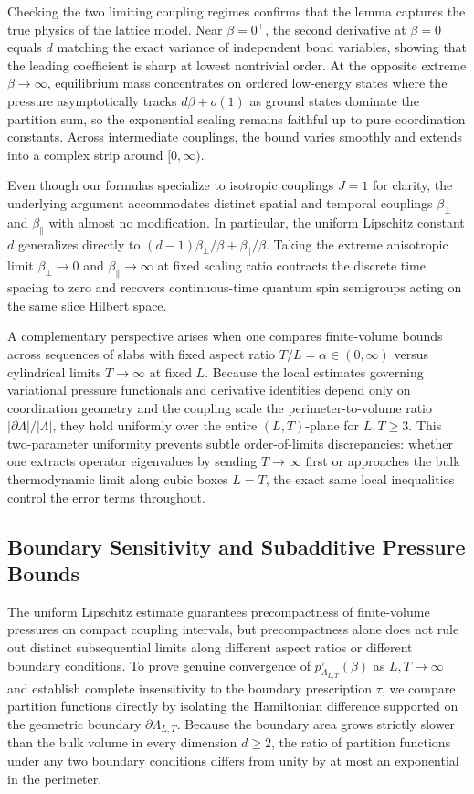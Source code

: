 \documentclass[11pt]{article}
\theoremstyle{definition}
\begin{document}
Checking the two limiting coupling regimes confirms that the lemma captures the true
physics of the lattice model. Near $\beta = 0^+$, the second derivative at $\beta =
0$ equals $d$ matching the exact variance of independent bond variables, showing
that the leading coefficient is sharp at lowest nontrivial order. At the opposite
extreme $\beta \to \infty$, equilibrium mass concentrates on ordered low-energy
states where the pressure asymptotically tracks $d\beta + o(1)$ as ground states
dominate the partition sum, so the exponential scaling remains faithful up to pure
coordination constants. Across intermediate couplings, the bound varies smoothly and
extends into a complex strip around $[0, \infty)$.

Even though our formulas specialize to isotropic couplings $J = 1$ for clarity, the
underlying argument accommodates distinct spatial and temporal couplings
$\beta_\perp$ and $\beta_\parallel$ with almost no modification. In particular, the
uniform Lipschitz constant $d$ generalizes directly to $(d-1)\beta_\perp / \beta +
\beta_\parallel / \beta$. Taking the extreme anisotropic limit $\beta_\perp \to 0$
and $\beta_\parallel \to \infty$ at fixed scaling ratio contracts the discrete time
spacing to zero and recovers continuous-time quantum spin semigroups acting on the
same slice Hilbert space.

A complementary perspective arises when one compares finite-volume bounds across
sequences of slabs with fixed aspect ratio $T / L = \alpha \in (0, \infty)$ versus
cylindrical limits $T \to \infty$ at fixed $L$. Because the local estimates
governing variational pressure functionals and derivative identities depend only on
coordination geometry and the coupling scale the perimeter-to-volume ratio
$|\partial \Lambda|/|\Lambda|$, they hold uniformly over the entire $(L, T)$-plane
for $L, T \ge 3$. This two-parameter uniformity prevents subtle order-of-limits
discrepancies: whether one extracts operator eigenvalues by sending $T \to \infty$
first or approaches the bulk thermodynamic limit along cubic boxes $L = T$, the
exact same local inequalities control the error terms throughout.

\subsection{Boundary Sensitivity and Subadditive Pressure Bounds}
\label{subsec:s02b}

The uniform Lipschitz estimate guarantees precompactness of finite-volume pressures
on compact coupling intervals, but precompactness alone does not rule out distinct
subsequential limits along different aspect ratios or different boundary conditions.
To prove genuine convergence of $p_{\Lambda_{L,T}}^\tau(\beta)$ as $L, T \to \infty$
and establish complete insensitivity to the boundary prescription $\tau$, we compare
partition functions directly by isolating the Hamiltonian difference supported on
the geometric boundary $\partial \Lambda_{L,T}$. Because the boundary area grows
strictly slower than the bulk volume in every dimension $d \ge 2$, the ratio of
partition functions under any two boundary conditions differs from unity by at most
an exponential in the perimeter.
\end{document}
